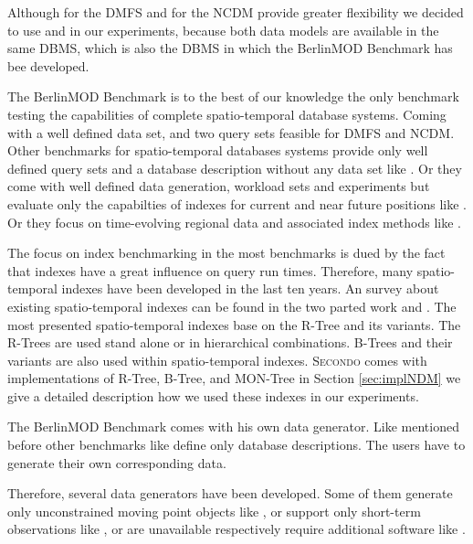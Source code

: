 \documentclass[a4paper]{article}
\newcommand{\secondo}{\textsc{Secondo}}
\newcommand{\bmodb} {BerlinMOD Benchmark}
\begin{document}
Although \cite{STAUPelekis} for the DMFS and \cite{DynamicTransportNetworkDing} for
the NCDM provide greater flexibility we decided to use
\cite{DataModelDataStructureGueting} and \cite{NetworkGueting} in our
experiments, because both data models are available in the same DBMS, which is
also the DBMS in which the \bmodb{} \cite{BerlinMODVLDBDuentgen} has bee developed.

The \bmodb{} \cite{BerlinMODVLDBDuentgen} is to the best of our knowledge the only
benchmark testing the capabilities of complete spatio-temporal database systems.
Coming with a well defined data set, and two query sets feasible for DMFS and NCDM.
Other benchmarks for spatio-temporal databases systems provide only well defined
query sets and a database description without any data set like
\cite{QueriesTheodoridis}.
Or they come with well defined data generation, workload sets and experiments but
evaluate only the capabilties of indexes for current and near future positions like
\cite{COSTBenchmarkJensen}. Or they focus on time-evolving regional data and
associated
index methods like \cite{BenchmarkTzouramanis}.

The focus on index benchmarking in the most benchmarks is dued by the fact that
indexes have a great influence on query run times. Therefore, many spatio-temporal
indexes have been developed in the last ten years. An survey about existing
spatio-temporal
indexes can be found in the two parted work \cite{STAMSurvey1} and
\cite{STAMSurvey2}.
The most presented spatio-temporal indexes base on the R-Tree \cite{RTreeGuttmann}
and its variants. The R-Trees are used stand alone or in hierarchical combinations.
B-Trees \cite{BTreeBayer} and their variants are also used within spatio-temporal
indexes. \secondo{} comes with implementations of R-Tree, B-Tree, and MON-Tree
\cite{MONTreeAlmeidaGeoinformatica} in Section \ref{sec:implNDM} we give a detailed
description how we used these indexes in our experiments.

The \bmodb{} comes with his own data generator. Like mentioned before other
benchmarks like \cite{QueriesTheodoridis} define only database descriptions.
The users have to generate their own corresponding data.

Therefore, several data generators have been developed. Some of them generate
only unconstrained moving point objects like \cite{OportoSaglio}, or support
only short-term observations like \cite{BrinkhoffsDataGenerator}, or are
unavailable respectively require additional software like \cite{STACTS}.
\end{document}
